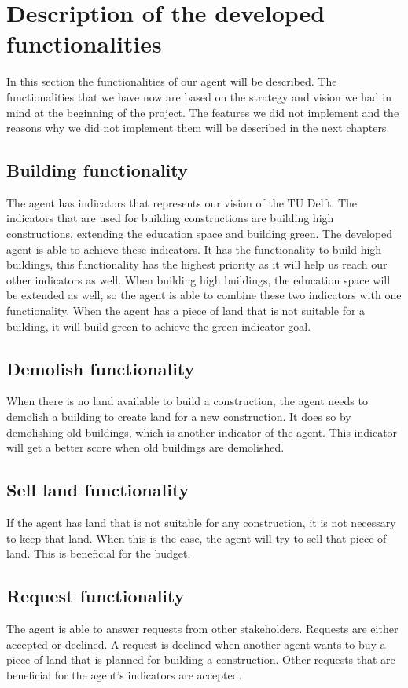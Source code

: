 \chapter{Description of the developed functionalities}
In this section the functionalities of our agent will be described.
The functionalities that we have now are based on the strategy and vision we had in mind at the beginning of the project.
The features we did not implement and the reasons why we did not implement them will be described in the next chapters. 

\section{Building functionality}
The agent has indicators that represents our vision of the TU Delft.
The indicators that are used for building constructions are building high constructions, extending the education space and building green.
The developed agent is able to achieve these indicators. 
It has the functionality to build high buildings, this functionality has the highest priority as it will help us reach our other indicators as well.
When building high buildings, the education space will be extended as well, so the agent is able to combine these two indicators with one functionality.
When the agent has a piece of land that is not suitable for a building, it will build green to achieve the green indicator goal.

\section{Demolish functionality}
When there is no land available to build a construction, the agent needs to demolish a building to create land for a new construction.
It does so by demolishing old buildings, which is another indicator of the agent.
This indicator will get a better score when old buildings are demolished.

\section{Sell land functionality}
If the agent has land that is not suitable for any construction, it is not necessary to keep that land. When this is the case, the agent will try to sell that piece of land. This is beneficial for the budget.

\section{Request functionality}
The agent is able to answer requests from other stakeholders. Requests are either accepted or declined. A request is declined when another agent wants to buy a piece of land that is planned for building a construction. Other requests that are beneficial for the agent’s indicators are accepted.
